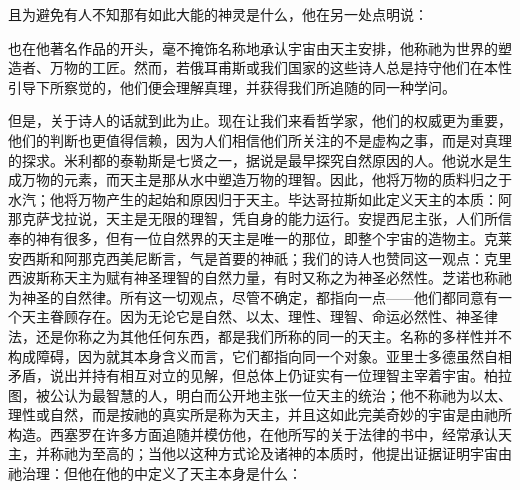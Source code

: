 \par

且为避免有人不知那有如此大能的神灵是什么，他在另一处点明说：\par

也在他著名作品的开头，毫不掩饰名称地承认宇宙由天主安排，他称祂为世界的塑造者、万物的工匠。然而，若俄耳甫斯或我们国家的这些诗人总是持守他们在本性引导下所察觉的，他们便会理解真理，并获得我们所追随的同一种学问。\par

但是，关于诗人的话就到此为止。现在让我们来看哲学家，他们的权威更为重要，他们的判断也更值得信赖，因为人们相信他们所关注的不是虚构之事，而是对真理的探求。米利都的泰勒斯是七贤之一，据说是最早探究自然原因的人。他说水是生成万物的元素，而天主是那从水中塑造万物的理智。因此，他将万物的质料归之于水汽；他将万物产生的起始和原因归于天主。毕达哥拉斯如此定义天主的本质：阿那克萨戈拉说，天主是无限的理智，凭自身的能力运行。安提西尼主张，人们所信奉的神有很多，但有一位自然界的天主是唯一的那位，即整个宇宙的造物主。克莱安西斯和阿那克西美尼断言，气是首要的神祇；我们的诗人也赞同这一观点：克里西波斯称天主为赋有神圣理智的自然力量，有时又称之为神圣必然性。芝诺也称祂为神圣的自然律。所有这一切观点，尽管不确定，都指向一点——他们都同意有一个天主眷顾存在。因为无论它是自然、以太、理性、理智、命运必然性、神圣律法，还是你称之为其他任何东西，都是我们所称的同一的天主。名称的多样性并不构成障碍，因为就其本身含义而言，它们都指向同一个对象。亚里士多德虽然自相矛盾，说出并持有相互对立的见解，但总体上仍证实有一位理智主宰着宇宙。柏拉图，被公认为最智慧的人，明白而公开地主张一位天主的统治；他不称祂为以太、理性或自然，而是按祂的真实所是称为天主，并且这如此完美奇妙的宇宙是由祂所构造。西塞罗在许多方面追随并模仿他，在他所写的关于法律的书中，经常承认天主，并称祂为至高的；当他以这种方式论及诸神的本质时，他提出证据证明宇宙由祂治理：但他在他的中定义了天主本身是什么：\par


